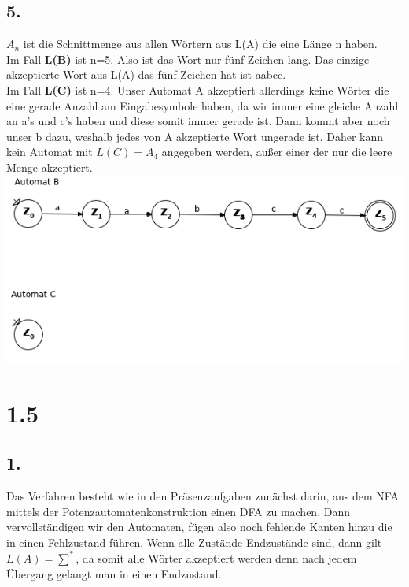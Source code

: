 \documentclass[a4paper,12pt]{scrartcl}
\begin{document}
\subsection*{5.}
$A_{n}$ ist die Schnittmenge aus allen Wörtern aus L(A) die eine Länge n haben. \\
Im Fall \textbf{L(B)} ist n=5. Also ist das Wort nur fünf Zeichen lang. Das einzige akzeptierte Wort aus L(A) das fünf Zeichen hat ist aabcc.\\
Im Fall \textbf{L(C)} ist n=4. Unser Automat A akzeptiert allerdings keine Wörter die eine gerade Anzahl am Eingabesymbole haben, da wir immer eine gleiche Anzahl an a's und c's haben und diese somit immer gerade ist. Dann kommt aber noch unser b dazu, weshalb jedes von A akzeptierte Wort ungerade ist. Daher kann kein Automat mit $L(C)=A_{4}$ angegeben werden, außer einer der nur die leere Menge akzeptiert.
\includegraphics[scale=0.5]{145.png}
 
\section*{1.5}
\subsection*{1.}
Das Verfahren besteht wie in den Präsenzaufgaben zunächst darin, aus dem NFA mittels der Potenzautomatenkonstruktion einen DFA zu machen. Dann vervollständigen wir den Automaten, fügen also noch fehlende Kanten hinzu die in einen Fehlzustand führen. Wenn alle Zustände Endzustände sind, dann gilt $L(A)=\sum^{*}$, da somit alle Wörter akzeptiert werden denn nach jedem Übergang gelangt man in einen Endzustand.
\end{document}
